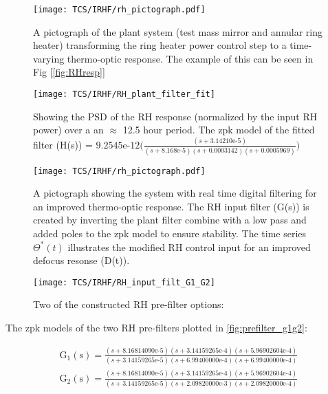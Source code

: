 \begin{figure}[H]
    \centering
    \texttt{[image: TCS/IRHF/rh\_pictograph.pdf]}
    \caption{A pictograph of the plant system (test mass mirror and annular ring heater) transforming the ring heater power control step to a time-varying thermo-optic response. The example of this can be seen in Fig [\ref{fig:RHresp}]}
    \label{fig:justplant}
\end{figure}

\begin{figure}[H]
    \centering
    \texttt{[image: TCS/IRHF/RH\_plant\_filter\_fit]}
    \caption{Showing the PSD of the RH response (normalized by the input RH power) over a an $\approx$ 12.5 hour period. The zpk model of the fitted filter (H(s)) = $9.2545\mathrm{e} \text{-}12 \Big(\frac{(s+3.14210\mathrm{e}\text{-}5)}{(s+8.168\mathrm{e}\text{-}5)(s+0.0003142)(s+0.0005969)}\Big)$}
    \label{fig:plant_v_fit}
\end{figure}

\begin{figure}[H]
    \centering
    \texttt{[image: TCS/IRHF/rh\_pictograph.pdf]}
    \caption{A pictograph showing the system with real time digital filtering for an improved thermo-optic response. The RH input filter (G(s)) is created by inverting the plant filter combine with a low pass and added poles to the zpk model to ensure stability. The time series $\Theta^*(t)$ illustrates the modified RH control input for an improved defocus resonse (D(t)).}
    \label{fig:rtdf_pictograph}
\end{figure}

\begin{figure}[H]
    \centering
    \texttt{[image: TCS/IRHF/RH\_input\_filt\_G1\_G2]}
    \caption{Two of the constructed RH pre-filter options: 
	}
    \label{fig:prefilter_g1g2}
\end{figure}

The zpk models of the two RH pre-filters plotted in \autoref{fig:prefilter_g1g2}:

\begin{equation}
   \begin{aligned}
       \mathrm{G}_1(\mathrm{s}) = \frac{(s+8.16814090\mathrm{e}\text{-}5) (s+3.14159265\mathrm{e}\text{-}4) (s+5.96902604\mathrm{e}\text{-}4)}{(s+3.14159265\mathrm{e}\text{-}5)(s+6.99400000\mathrm{e}\text{-}4)(s+6.99400000\mathrm{e}\text{-}4)} \\
       \mathrm{G}_2(\mathrm{s}) = \frac{(s+8.16814090\mathrm{e}\text{-}5) (s+3.14159265\mathrm{e}\text{-}4) (s+5.96902604\mathrm{e}\text{-}4)}{(s+3.14159265\mathrm{e}\text{-}5)(s+2.09820000\mathrm{e}\text{-}3)(s+2.09820000\mathrm{e}\text{-}4)}
    \end{aligned}
\end{equation}

